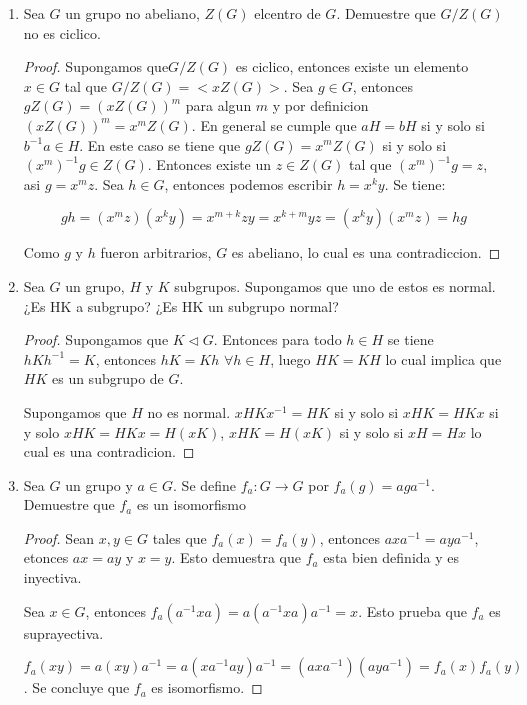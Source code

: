 \documentclass{article}
\theoremstyle{break}
\begin{document}
\begin{enumerate}
		\item Sea $G$ un grupo no abeliano, $Z(G)$ elcentro de $G$. Demuestre que $G/Z(G)$ no es ciclico.
		
		\begin{proof}
			Supongamos que$G/Z(G)$ es ciclico, entonces existe un elemento $x\in G$ tal que $G/Z(G)=<xZ(G)>$. Sea $g\in G$, entonces $gZ(G)=(xZ(G))^m$ para algun $m$ y por definicion $(xZ(G))^m=x^mZ(G)$. En general se cumple que $aH=bH$ si y solo si $b^{-1}a\in H$. En este caso se tiene que $gZ(G)=x^mZ(G)$ si y solo si $(x^m)^{-1}g\in Z(G)$. Entonces existe un $z\in Z(G)$ tal que $(x^m)^{-1}g=z$, asi $g=x^mz$. Sea $h\in G$, entonces podemos escribir $h=x^ky$. Se tiene:
			
			$$
			gh=(x^mz)(x^ky)=x^{m+k}zy=x^{k+m}yz=(x^ky)(x^mz)=hg
			$$
			
			Como $g$ y $h$ fueron arbitrarios, $G$ es abeliano, lo cual es una contradiccion.
		\end{proof}
		
		\item Sea $G$ un grupo, $H$ y $K$ subgrupos. Supongamos que uno de estos es normal. ¿Es HK a subgrupo? ¿Es HK un subgrupo normal?
		
		\begin{proof}
			Supongamos que $K\triangleleft G$. Entonces para todo $h\in H$ se tiene $hKh^{-1}=K$, entonces $hK=Kh$ $\forall h\in H$, luego $HK=KH$ lo cual implica que $HK$ es un subgrupo de $G$.
			
			Supongamos que $H$ no es normal. $xHKx^{-1}=HK$ si y solo si $xHK=HKx$ si y solo $xHK=HKx=H(xK)$, $xHK=H(xK)$ si y solo si $xH=Hx$ lo cual es una contradicion.
		\end{proof}
		
		\item Sea $G$ un grupo y $a\in G$. Se define $f_a:G\rightarrow G$ por $f_a(g)=aga^{-1}$. Demuestre que $f_a$ es un isomorfismo
		
		\begin{proof}
			Sean $x,y\in G$ tales que $f_a(x)=f_a(y)$, entonces $axa^{-1}=aya^{-1}$, etonces $ax=ay$ y $x=y$. Esto demuestra que $f_a$ esta bien definida y es inyectiva.
			
			Sea $x\in G$, entonces $f_a(a^{-1}xa)=a(a^{-1}xa)a^{-1}=x$. Esto prueba que $f_a$ es suprayectiva.
			
			$f_a(xy)=a(xy)a^{-1}=a(xa^{-1}ay)a^{-1}=(axa^{-1})(aya^{-1})=f_a(x)f_a(y)$. Se concluye que $f_a$ es isomorfismo.
		\end{proof}
		

\end{enumerate}
\end{document}
